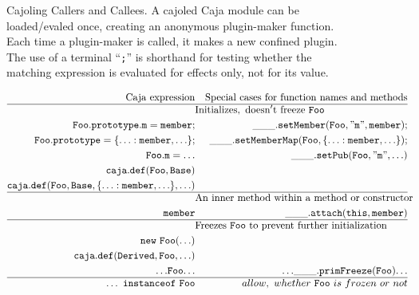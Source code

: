 \documentclass[letterpaper,twocolumn,10pt]{article}
\newcommand{\code}[1]{{\tt {#1}}}              %
\begin{document}
\begin{figure}
\caption[Cajoling Callers and Callees]{Cajoling Callers and Callees. A 
cajoled Caja module can be loaded/evaled once, creating an anonymous 
plugin-maker function. Each time a plugin-maker is called, it makes a new 
confined plugin. The use of a terminal ``\code{;}'' is shorthand for testing 
whether the matching expression is evaluated for effects only, not for its 
value. }
\label{tab:call-xlate}
\end{figure}


\begin{figure}
\begin{eqnarray}
  \mathrm{Caja\ expression}         & \nonumber & \mathrm{Special\ cases\ for\ function\ names\ and\ methods} \\ 
  \hline
  \nonumber & \lefteqn{\mathrm{Initializes,\ doesn't\ freeze\ \code{Foo}}} & \\
  \code{Foo.prototype.m = member;}  & \label{set:member} & \code{\_\_\_.setMember(Foo, "m", member);} \\
  \code{Foo.prototype = \{\ldots:member,{\ldots}\};} 
                            & \label{set:member-map} & \code{\_\_\_.setMemberMap(Foo,\{\ldots:member,{\ldots}\});} \\
  \code{Foo.m = \ldots}     & \label{set:static}     & \code{\_\_\_.setPub(Foo, "m", \ldots)} \\
  \code{caja.def(Foo,Base)} & \label{call:caja-def}  & \\
  \code{caja.def(Foo,Base,\{\ldots:member,{\ldots}\},\ldots)} 
                            & \nonumber              & \\
  \hline
  \nonumber                 & \lefteqn{\mathrm{An\ inner\ method\ within\ a\ method\ or\ constructor}} & \\
  \code{member}             & \label{func:attached-method} & \code{\_\_\_.attach(this,member)} \\
  \hline
 \nonumber & \lefteqn{\mathrm{Freezes\ \code{Foo}\ to\ prevent\ further\ initialization}} & \\ 
  \code{new\ Foo(\ldots)}   & \label{new:ctor-freeze}      & \\ 
  \code{caja.def(Derived,Foo,\ldots)} & \nonumber          & \\
  \code{{\ldots} Foo {\ldots}} & \label{var:func-name}     & \code{{\ldots} \_\_\_.primFreeze(Foo) {\ldots}} \\
  \hline
  \code{\ldots\ instanceof\ Foo} & \label{instanceof}      & allow,\ whether\ \code{Foo}\ is\ frozen\ or\ not\\ 

\end{eqnarray}
\end{figure}
\end{document}
